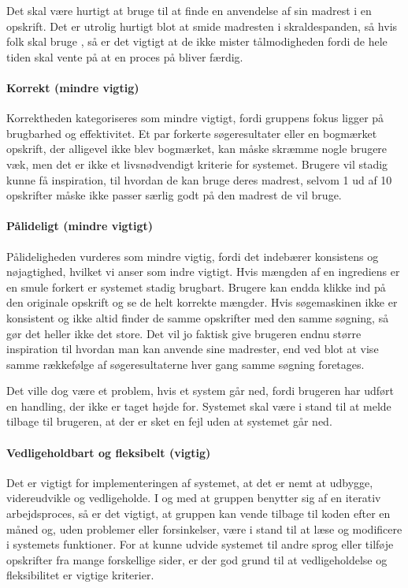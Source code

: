 Det skal være hurtigt at bruge \Foodl{} til at finde en anvendelse af sin madrest i en opskrift. Det er utrolig hurtigt blot at smide madresten i skraldespanden, så hvis folk skal bruge \Foodl{}, så er det vigtigt at de ikke mister tålmodigheden fordi de hele tiden skal vente på at en proces på \Foodl{} bliver færdig. 

\paragraph{Korrekt (mindre vigtig)} 
Korrektheden kategoriseres som mindre vigtigt, fordi gruppens fokus ligger på brugbarhed og effektivitet. Et par forkerte søgeresultater eller en bogmærket opskrift, der alligevel ikke blev bogmærket, kan måske skræmme nogle brugere væk, men det er ikke et livsnødvendigt kriterie for systemet. Brugere vil stadig kunne få inspiration, til hvordan de kan bruge deres madrest, selvom 1 ud af 10 opskrifter måske ikke passer særlig godt på den madrest de vil bruge.

\paragraph{Pålideligt (mindre vigtigt)} 
Pålideligheden vurderes som mindre vigtig, fordi det indebærer konsistens og nøjagtighed, hvilket vi anser som indre vigtigt. Hvis mængden af en ingrediens er en smule forkert er systemet stadig brugbart. Brugere kan endda klikke ind på den originale opskrift og se de helt korrekte mængder. Hvis søgemaskinen ikke er konsistent og ikke altid finder de samme opskrifter med den samme søgning, så gør det heller ikke det store. Det vil jo faktisk give brugeren endnu større inspiration til hvordan man kan anvende sine madrester, end ved blot at vise samme rækkefølge af søgeresultaterne hver gang samme søgning foretages.

Det ville dog være et problem, hvis et system går ned, fordi brugeren har udført en handling, der ikke er taget højde for. Systemet skal være i stand til at melde tilbage til brugeren, at der er sket en fejl uden at systemet går ned.

\paragraph{Vedligeholdbart og fleksibelt (vigtig)} 
Det er vigtigt for implementeringen af systemet, at det er nemt at udbygge, videreudvikle og vedligeholde. I og med at gruppen benytter sig af en iterativ arbejdsproces, så er det vigtigt, at gruppen kan vende tilbage til koden efter \fx en måned og, uden problemer eller forsinkelser, være i stand til at læse og modificere i systemets funktioner. For at kunne udvide systemet til andre sprog eller tilføje opskrifter fra mange forskellige sider, er der god grund til at vedligeholdelse og fleksibilitet er vigtige kriterier.

